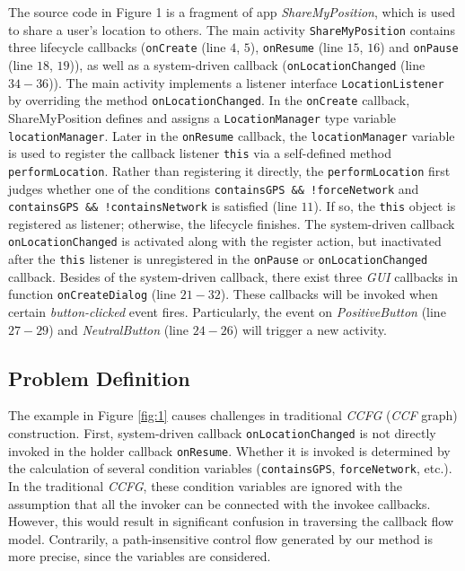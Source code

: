 The source code in Figure 1 is a fragment of app \emph{ShareMyPosition}, which is used to share a user's location to others. The main activity \texttt{ShareMyPosition} contains three lifecycle callbacks \big(\texttt{onCreate} (line $4$, $5$), \texttt{onResume} (line $15$, $16$) and \texttt{onPause} (line $18$, $19$)\big), as well as a system-driven callback \big(\texttt{onLocationChanged} (line $34-36$)\big). The main activity implements a listener interface \texttt{LocationListener} by overriding the method \texttt{onLocationChanged}. In the \texttt{onCreate} callback, ShareMyPosition defines and assigns a \texttt{LocationManager} type variable \texttt{locationManager}. Later in the \texttt{onResume} callback, the \texttt{locationManager} variable is used to register the callback listener \texttt{this} via a self-defined method \texttt{performLocation}. 
Rather than registering it directly, the \texttt{performLocation} first judges whether one of the conditions \texttt{containsGPS \&\& !forceNetwork} and \texttt{containsGPS \&\& !containsNetwork} is satisfied (line $11$). If so, the \texttt{this} object is registered as listener; otherwise, the lifecycle finishes. The system-driven callback \texttt{onLocationChanged} is activated along with the register action, but inactivated after the \texttt{this} listener is unregistered in the \texttt{onPause} or \texttt{onLocationChanged} callback. Besides of the system-driven callback, there exist three \textit{GUI} callbacks in function \texttt{onCreateDialog} (line $21-32$). These callbacks will be invoked when certain \textit{button-clicked} event fires. Particularly, the event on \textit{PositiveButton} (line $27-29$) and \textit{NeutralButton} (line $24-26$) will trigger a new activity.

 
\subsection{Problem Definition}\label{problem-define}
The example in Figure \ref{fig:1} causes challenges in traditional \textit{CCFG} (\textit{CCF} graph) construction. First, system-driven callback \texttt{onLocationChanged} is not directly invoked in the holder callback \texttt{onResume}. Whether it is invoked is determined by the calculation of several condition variables (\texttt{containsGPS}, \texttt{forceNetwork}, etc.). In the traditional \textit{CCFG}, these condition variables are ignored with the assumption that all the invoker can be connected with the invokee callbacks. However, this would result in significant confusion in traversing the callback flow model. Contrarily, a path-insensitive control flow generated by our method is more precise, since the variables are considered. 

